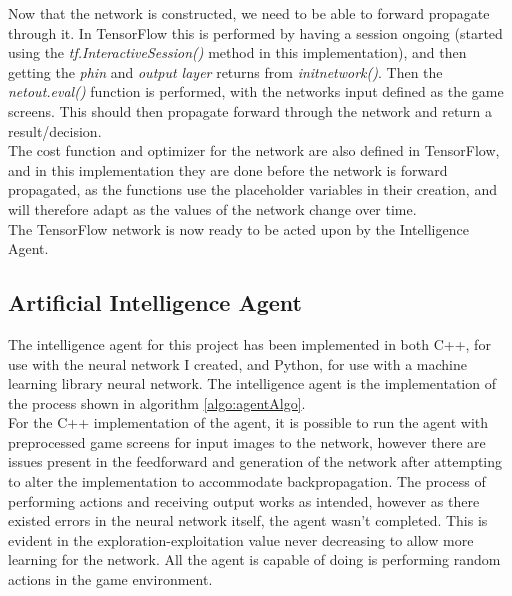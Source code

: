 \documentclass[10pt]{article}
\begin{document}
		Now that the network is constructed, we need to be able to forward propagate through it. In TensorFlow this is performed by having a session ongoing (started using the \textit{tf.InteractiveSession()} method in this implementation), and then getting the \textit{ph\textunderscore in} and \textit{output \textunderscore layer} returns from \textit{init\textunderscore network()}. Then the \textit{net\textunderscore out.eval()} function is performed, with the networks input defined as the game screens. This should then propagate forward through the network and return a result/decision.\\
		
		The cost function and optimizer for the network are also defined in TensorFlow, and in this implementation they are done before the network is forward propagated, as the functions use the placeholder variables in their creation, and will therefore adapt as the values of the network change over time.\\
		
		The TensorFlow network is now ready to be acted upon by the Intelligence Agent.
		
	\medskip
	
	\subsection{Artificial Intelligence Agent}
		The intelligence agent for this project has been implemented in both C++, for use with the neural network I created, and Python, for use with a machine learning library neural network. The intelligence agent is the implementation of the process shown in algorithm \ref{algo:agentAlgo}.\\
		
		For the C++ implementation of the agent, it is possible to run the agent with preprocessed game screens for input images to the network, however there are issues present in the feedforward and generation of the network after attempting to alter the implementation to accommodate backpropagation. The process of performing actions and receiving output works as intended, however as there existed errors in the neural network itself, the agent wasn't completed. This is evident in the exploration-exploitation value never decreasing to allow more learning for the network. All the agent is capable of doing is performing random actions in the game environment.\\
		
\end{document}
